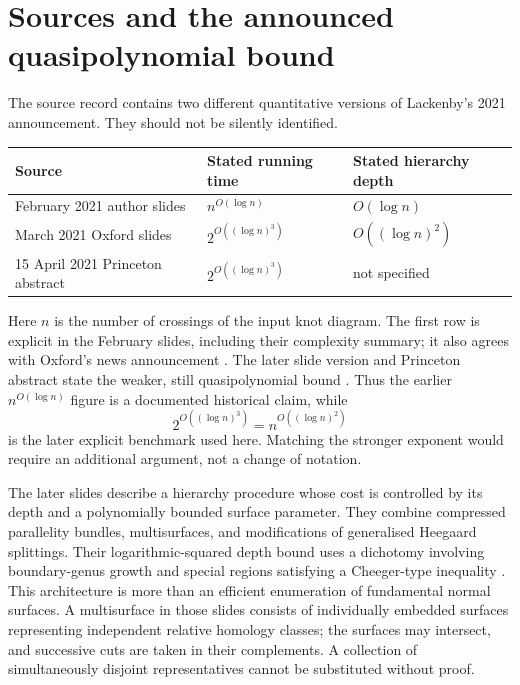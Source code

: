 \section{Sources and the announced quasipolynomial bound}
\label{sec:literature-status}

The source record contains two different quantitative versions of Lackenby's
2021 announcement.  They should not be silently identified.
\begin{center}
\begin{tabular}{lll}
\hline
Source & Stated running time & Stated hierarchy depth\\
\hline
February 2021 author slides & $n^{O(\log n)}$ & $O(\log n)$\\
March 2021 Oxford slides & $2^{O((\log n)^3)}$ & $O((\log n)^2)$\\
15 April 2021 Princeton abstract & $2^{O((\log n)^3)}$ & not specified\\
\hline
\end{tabular}
\end{center}
Here $n$ is the number of crossings of the input knot diagram.  The first
row is explicit in the February slides, including their complexity summary;
it also agrees with Oxford's news announcement
\cite{Lackenby2021February,Oxford2021Announcement}.  The later slide version
and Princeton abstract state the weaker, still quasipolynomial bound
\cite{Lackenby2021Oxford,Lackenby2021Princeton}.  Thus the earlier
$n^{O(\log n)}$ figure is a documented historical claim, while
\[
  2^{O((\log n)^3)}=n^{O((\log n)^2)}
\]
is the later explicit benchmark used here.  Matching the stronger exponent
would require an additional argument, not a change of notation.

The later slides describe a hierarchy procedure whose cost is controlled by
its depth and a polynomially bounded surface parameter.  They combine
compressed parallelity bundles, multisurfaces, and modifications of
generalised Heegaard splittings.  Their logarithmic-squared depth bound uses
a dichotomy involving boundary-genus growth and special regions satisfying
a Cheeger-type inequality \cite{Lackenby2021Oxford}.  This architecture is
more than an efficient enumeration of fundamental normal surfaces.  A
multisurface in those slides consists of individually embedded surfaces
representing independent relative homology classes; the surfaces may
intersect, and successive cuts are taken in their complements.  A collection
of simultaneously disjoint representatives cannot be substituted without
proof.

